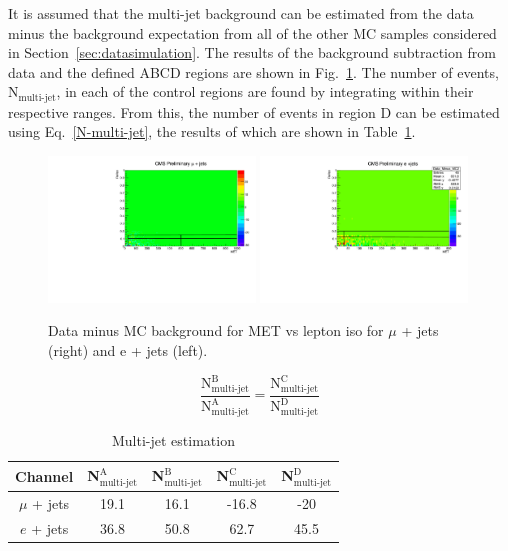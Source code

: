It is assumed that the multi-jet background can be estimated from the data minus the background expectation from all of the other MC samples considered in Section~\ref{sec:datasimulation}. The results of the background subtraction from data and the defined ABCD regions are shown in Fig.~\ref{fig:QCDplots}.
The number of events, N$_{\textrm{multi-jet}}$, in each of the control regions are found by integrating within their respective ranges. From this, the number of events in region D can be estimated using Eq.~\ref{N-multi-jet}, the results of which are shown in Table~\ref{tab:multijet}.

\begin{figure}[!ht]
    \includegraphics[width=0.49\textwidth]{images/Run1/Data_Minus_MC_Mu-1.pdf}
    \includegraphics[width=0.49\textwidth]{images/Run1/Data_Minus_MC_El.pdf}
    \caption{Data minus MC background for MET vs lepton iso for $\mu$ + jets (right) and e + jets (left).}
    \label{fig:QCDplots}
\end{figure}


\begin{equation}
\frac{\textrm{N}^{\textrm{B}}_{\textrm{multi-jet}}}{\textrm{N}^{\textrm{A}}_{\textrm{multi-jet}}} = \frac{\textrm{N}^{\textrm{C}}_{\textrm{multi-jet}}}{\textrm{N}^{\textrm{D}}_{\textrm{multi-jet}}}
\label{N-multi-jet}
\end{equation}

\begin{table}[ht!]
\caption{Multi-jet estimation}
\centering
\begin{tabular}{|c |c |c |c |c |}
 \hline 
 Channel & N$^{\textrm{A}}_{\textrm{multi-jet}}$  & N$^{\textrm{B}}_{\textrm{multi-jet}}$ & N$^{\textrm{C}}_{\textrm{multi-jet}}$ &N$^{\textrm{D}}_{\textrm{multi-jet}}$  \\
  \hline
$\mu$ + jets & 19.1 & 16.1 & -16.8 & -20  \\
 \hline
$e$ + jets & 36.8  & 50.8 & 62.7 &45.5  \\
\hline
\end{tabular}
\label{tab:multijet}
\end{table}

